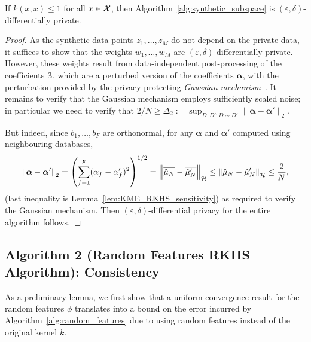 \begin{hprop}
	If $k(x, x) \leq 1$ for all $x \in \mathcal{X}$, then Algorithm~\ref{alg:synthetic_subspace} is $(\varepsilon, \delta)$-differentially private.
	\begin{proof}
		As the synthetic data points $z_1, \ldots, z_M$ do not depend on the private data, it suffices to show that the weights $w_1, \ldots, w_M$ are $(\varepsilon, \delta)$-differentially private. However, these weights result from data-independent post-processing of the coefficients $\boldsymbol{\beta}$, which are a perturbed version of the coefficients $\boldsymbol{\alpha}$, with the perturbation provided by the privacy-protecting \emph{Gaussian mechanism}~\cite{dwork_algorithmic_2014}. It remains to verify that the Gaussian mechanism employs sufficiently scaled noise; in particular we need to verify that $2/N \geq \Delta_2 := \sup_{D, D': D \sim D'} \| \boldsymbol{\alpha} - \boldsymbol{\alpha}' \|_2$.
		
		But indeed, since $b_1, \ldots, b_F$ are orthonormal, for any $\boldsymbol{\alpha}$ and $\boldsymbol{\alpha}'$ computed using neighbouring databases,
		\begin{equation}
		\left\| \boldsymbol{\alpha} - \boldsymbol{\alpha}' \right\|_2
		= \left( \sum_{f = 1}^F (\alpha_f - \alpha'_f)^2 \right)^{1/2}
		= \left\| \overline{\hat{\mu}_N} - \overline{\hat{\mu}'_N} \right\|_{\mathcal{H}}
		\leq \left\| \hat{\mu}_N - \hat{\mu}'_N \right\|_{\mathcal{H}}
		\leq \frac{2}{N}
		,
		\end{equation}
		(last inequality is Lemma~\ref{lem:KME_RKHS_sensitivity}) as required to verify the Gaussian mechanism. Then $(\varepsilon, \delta)$-differential privacy for the entire algorithm follows.
	\end{proof}
\end{hprop}



\subsection{Algorithm 2 (Random Features RKHS Algorithm): Consistency}
\label{app:sec:random_features_consistency}

As a preliminary lemma, we first show that a uniform convergence result for the random features $\phi$ translates into a bound on the error incurred by Algorithm~\ref{alg:random_features} due to using random features instead of the original kernel $k$.

